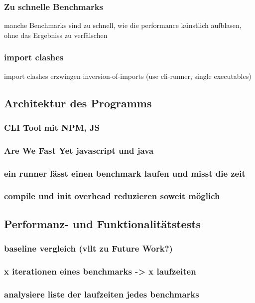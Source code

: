 \subsubsection{ Zu schnelle Benchmarks }
manche Benchmarks sind zu schnell, wie die performance künstlich aufblasen, ohne das Ergebniss zu verfälschen
\subsubsection{ import clashes}
import clashes erzwingen inversion-of-imports (use cli-runner, single executables)

\subsection{Architektur des Programms}
\subsubsection{ CLI Tool mit NPM, JS }
\subsubsection{ Are We Fast Yet javascript und java }
\subsubsection{ ein runner lässt einen benchmark laufen und misst die zeit }
\subsubsection{ compile und init overhead reduzieren soweit möglich }
  
\subsection{ Performanz- und Funktionalitätstests }
\subsubsection{ baseline vergleich (vllt zu Future Work?) }
\subsubsection{ x iterationen eines benchmarks -> x laufzeiten  }
\subsubsection{ analysiere liste der laufzeiten jedes benchmarks }
    
